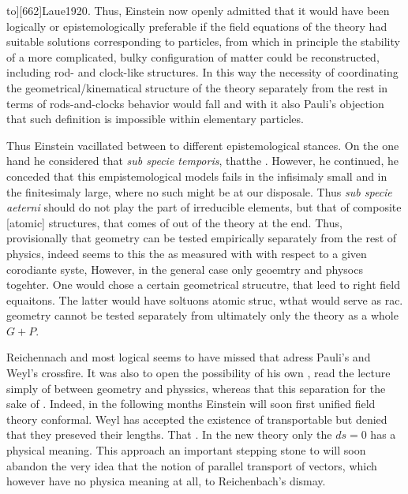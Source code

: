 {to][662\me]{Laue1920}. Thus, Einstein now openly admitted that it would have been logically or epistemologically preferable if the field equations of the theory had suitable solutions corresponding to particles, from which in principle the stability of a more complicated, bulky configuration of matter could be reconstructed, including rod- and clock-like structures. In this way the necessity of coordinating the geometrical/kinematical structure of the theory separately from the rest in terms of rods-and-clocks behavior would fall and with it also Pauli's objection that such definition is impossible within elementary particles.

Thus Einstein vacillated between to different epistemological stances. On the one hand he considered that \textit{sub specie temporis}, thatthe   . However, he continued, he conceded that this empistemological models fails in the infisimaly small and in the finitesimaly large, where no such \rac might be at our disposale. Thus \emph{sub specie aeterni} \rac should do not play the part of irreducible elements, but that of composite [atomic] structures, that comes of out of the theory at the end. Thus, provisionally that geometry can be tested empirically separately from the rest of physics, indeed \gr seems to this the \gmn as measured with \rac with respect to a given corodiante syste, However, in the general case only geoemtry and physocs togehter. One would chose a certain geometrical strucutre, that leed to right field equaitons. The latter would have soltuons atomic struc, wthat would serve as rac.  geometry cannot be tested separately from ultimately only the theory as a whole $G+P$. 

Reichennach and most logical seems to have missed that adress Pauli's and Weyl's crossfire. It was also to open the possibility of his own \uftp, read the lecture simply of between geometry and physsics, whereas that this separation for the sake of \uftp. Indeed, in the following months Einstein will soon first unified field theory conformal. Weyl has accepted the existence of transportable \rac but denied that they preseved their lengths. That . In the new theory only the $ds=0$ has a physical meaning. This approach an important stepping stone to will soon abandon the very idea that the notion of parallel transport of vectors, which however have no physica meaning at all, to Reichenbach's dismay.

}
